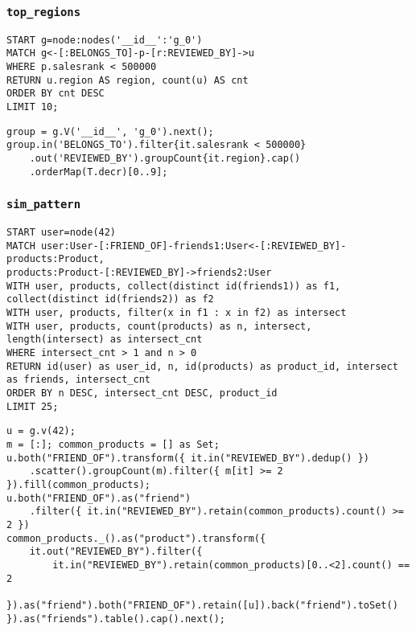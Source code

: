 \subsubsection*{\texttt{top\_regions}}

\begin{lstlisting}
START g=node:nodes('__id__':'g_0')
MATCH g<-[:BELONGS_TO]-p-[r:REVIEWED_BY]->u
WHERE p.salesrank < 500000
RETURN u.region AS region, count(u) AS cnt
ORDER BY cnt DESC
LIMIT 10;
\end{lstlisting}

\begin{lstlisting}
group = g.V('__id__', 'g_0').next();
group.in('BELONGS_TO').filter{it.salesrank < 500000}
	.out('REVIEWED_BY').groupCount{it.region}.cap()
	.orderMap(T.decr)[0..9];
\end{lstlisting}

\subsubsection*{\texttt{sim\_pattern}}

\begin{lstlisting}
START user=node(42)
MATCH user:User-[:FRIEND_OF]-friends1:User<-[:REVIEWED_BY]-products:Product,
products:Product-[:REVIEWED_BY]->friends2:User
WITH user, products, collect(distinct id(friends1)) as f1, collect(distinct id(friends2)) as f2
WITH user, products, filter(x in f1 : x in f2) as intersect
WITH user, products, count(products) as n, intersect, length(intersect) as intersect_cnt
WHERE intersect_cnt > 1 and n > 0
RETURN id(user) as user_id, n, id(products) as product_id, intersect as friends, intersect_cnt
ORDER BY n DESC, intersect_cnt DESC, product_id
LIMIT 25;
\end{lstlisting}

\begin{lstlisting}
u = g.v(42);
m = [:]; common_products = [] as Set;
u.both("FRIEND_OF").transform({ it.in("REVIEWED_BY").dedup() })
	.scatter().groupCount(m).filter({ m[it] >= 2 }).fill(common_products);
u.both("FRIEND_OF").as("friend")
	.filter({ it.in("REVIEWED_BY").retain(common_products).count() >= 2 })
common_products._().as("product").transform({
	it.out("REVIEWED_BY").filter({
		it.in("REVIEWED_BY").retain(common_products)[0..<2].count() == 2
	}).as("friend").both("FRIEND_OF").retain([u]).back("friend").toSet()
}).as("friends").table().cap().next();
\end{lstlisting}



